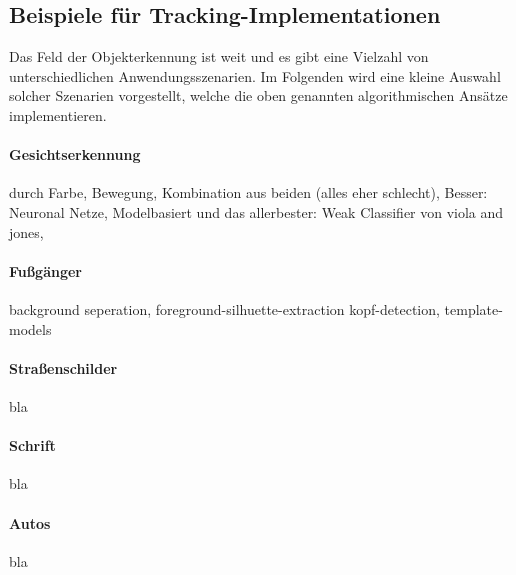 \begin{comment}
(Hier werden die prinzipiellen Arbeitsweisen des Core-Algorithmus TLD dargestellt und erläutert. Einleitend werden sie anhand von Diagrammen/Bildern/Beispielen erläutert, unter den folgenden Teilüberschriften wird vertiefend erklärt.

Die Initialisierung des Algorithmus erfolgt über die Definition der BoundingBox. Dies kann auf unterschiedliche Weise, wie z.B. das Markieren eines Objekts in einem Kamera- oder Videobild, oder durch vorgeschaltete Programmteile, die auf das Erkennen eines bestimmten Objekts trainiert wurden, geschehen. Ausgehende von diesem ersten Bild werden die einzelnen Komponenten initialisiert. )
\end{comment}



\subsection{Beispiele für Tracking-Implementationen}
Das Feld der Objekterkennung ist weit und es gibt eine Vielzahl von unterschiedlichen Anwendungsszenarien. Im Folgenden wird eine kleine Auswahl solcher Szenarien vorgestellt, welche die oben genannten algorithmischen Ansätze implementieren.

\paragraph{Gesichtserkennung}
durch Farbe, Bewegung, Kombination aus beiden (alles eher schlecht), Besser: Neuronal Netze, Modelbasiert und das allerbester: Weak Classifier von viola and jones,

\paragraph{Fußgänger}
background seperation, foreground-silhuette-extraction kopf-detection, template-models

\paragraph{Straßenschilder}
bla

\paragraph{Schrift}
bla

\paragraph{Autos}
bla